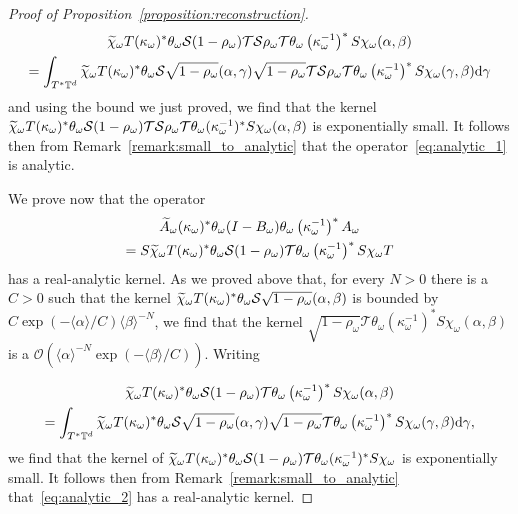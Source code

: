 \documentclass[10pt]{amsart}
\theoremstyle{definition}\newtheorem{defi}[theo]{Definition}\newtheorem{rema}[theo]{Remark}\newtheorem{exam}[theo]{Example}\newtheorem{exem}[theo]{Example}\newtheorem{nota}[theo]{Notation}
\newcommand{\brac}[1]{\langle #1 \rangle}
\newcommand{\clO}{\mathcal{O}}
\newcommand{\clT}{\mathcal{T}}
\newcommand{\clS}{\mathcal{S}}
\newcommand{\bbT}{\mathbb{T}}
\newcommand{\rmd}{\mathrm{d}}
\let\oldtilde\tilde
\renewcommand*{\tilde}[1]{\mathchoice{\widetilde{#1}}{\widetilde{#1}}{\oldtilde{#1}}{\oldtilde{#1}}}
\begin{document}
\begin{proof}[Proof of Proposition~\ref{proposition:reconstruction}]
\begin{multline*}
\tilde{\chi}_\omega T (\kappa_\omega)^*\theta_\omega \clS (1 - \rho_\omega) \clT \clS \rho_\omega \clT \theta_\omega \left(\kappa_\omega^{-1}\right)^* S \chi_\omega(\alpha,\beta) \\
= \int_{T^* \bbT^d} \tilde{\chi}_\omega T (\kappa_\omega)^*\theta_\omega \clS \sqrt{1 - \rho_\omega}(\alpha,\gamma) \sqrt{1 - \rho_\omega}\clT \clS \rho_\omega \clT \theta_\omega \left(\kappa_\omega^{-1}\right)^* S \chi_\omega(\gamma,\beta) \rmd \gamma
\end{multline*}
and using the bound we just proved, we find that the kernel $\tilde{\chi}_\omega T (\kappa_\omega)^*\theta_\omega \clS (1 - \rho_\omega) \clT \clS \rho_\omega \clT \theta_\omega (\kappa_\omega^{-1})^* S \chi_\omega(\alpha,\beta)$ is exponentially small. It follows then from Remark~\ref{remark:small_to_analytic} that the operator~\eqref{eq:analytic_1} is analytic.

We prove now that the operator
\begin{multline}\label{eq:analytic_2}
\widetilde{A}_\omega (\kappa_\omega)^* \theta_\omega (I - B_\omega) \theta_\omega \left(\kappa_\omega^{-1}\right)^* A_\omega \\
 = S \tilde{\chi}_\omega T (\kappa_\omega)^*\theta_\omega \clS (1 - \rho_\omega) \clT \theta_\omega \left(\kappa_\omega^{-1}\right)^* S \chi_\omega T
\end{multline}
has a real-analytic kernel. As we proved above that, for every $N > 0$ there is a $C > 0$ such that the kernel $\tilde{\chi}_\omega T (\kappa_\omega)^*\theta_\omega \clS \sqrt{1 - \rho_\omega}(\alpha,\beta)$ is bounded by $C\exp(- \brac{\alpha}/C) \brac{\beta}^{-N}$, we find that the kernel $\sqrt{1 - \rho_\omega} \clT \theta_\omega (\kappa_\omega^{-1})^* S \chi_\omega(\alpha,\beta)$ is a $\clO(\brac{\alpha}^{-N} \exp(- \brac{\beta}/C))$. Writing

\begin{multline*}
\tilde{\chi}_\omega T (\kappa_\omega)^*\theta_\omega \clS (1 - \rho_\omega) \clT \theta_\omega \left(\kappa_\omega^{-1}\right)^* S \chi_\omega(\alpha,\beta)\\ = \int_{T^* \bbT^d} \tilde{\chi}_\omega T (\kappa_\omega)^*\theta_\omega \clS \sqrt{1 - \rho_\omega}(\alpha,\gamma)\sqrt{1 - \rho_\omega} \clT \theta_\omega \left(\kappa_\omega^{-1}\right)^* S \chi_\omega(\gamma,\beta) \rmd \gamma,
\end{multline*}
we find that the kernel of $\tilde{\chi}_\omega T (\kappa_\omega)^*\theta_\omega \clS (1 - \rho_\omega) \clT \theta_\omega (\kappa_\omega^{-1})^* S \chi_\omega$ is exponentially small. It follows then from Remark~\ref{remark:small_to_analytic} that~\eqref{eq:analytic_2} has a real-analytic kernel.


\end{proof}
\end{document}
